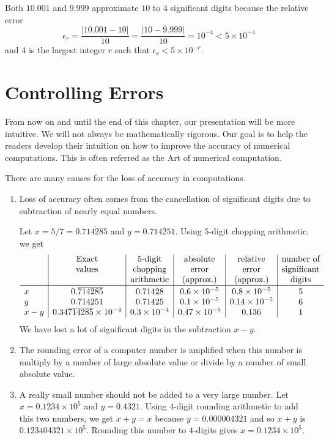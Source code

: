 \begin{egg}
Both $10.001$ and $9.999$ approximate $10$ to $4$ significant
digits because the relative error
\[
\epsilon_r = \frac{|10.001 - 10|}{10} = \frac{|10-9.999|}{10}
= 10^{-4} < 5 \times 10^{-4}
\]
and $4$ is the largest integer $r$ such that $\epsilon_r < 5 \times
10^{-r}$.
\end{egg}

\section{Controlling Errors}

From now on and until the end of this chapter, our presentation will
be more intuitive.  We will not always be mathematically rigorous.
Our goal is to help the readers develop their intuition on how to
improve the accuracy of numerical computations.  This is often
referred as the Art of numerical computation.

There are many causes for the loss of accuracy in computations.

\begin{enumerate}
\item Loss of accuracy often comes from the cancellation of significant
digits due to subtraction of nearly equal numbers.

Let $x= 5/7 = 0.\overline{714285}$ and $y=0.714251$.  Using $5$-digit
chopping arithmetic, we get
\[
\begin{array}{l|c|c|c|c|c}
& \text{Exact} & \text{$5$-digit} & \text{absolute} & \text{relative} &
\text{number of} \\
& \text{values} & \text{chopping} & \text{error} & \text{error} &
\text{significant} \\
& & \text{arithmetic} & \text{(approx.)} & \text{(approx.)} & \text{digits} \\
\hline
x & \rule{0em}{1em} 0.\overline{714285} & 0.71428 & 0.6 \times 10^{-5} &
0.8 \times 10^{-5} & 5 \\
y & 0.714251 & 0.71425 & 0.1 \times 10^{-5} & 0.14\times 10^{-5} & 6 \\
x-y & 0.34\overline{714285}\times 10^{-4} & 0.3 \times 10^{-4} &
0.47\times 10^{-5} & 0.136 & 1
\end{array}
\]
We have lost a lot of significant digits in the subtraction $x-y$.
\item The rounding error of a computer number is amplified when this number
is multiply by a number of large absolute value or divide by a number of
small absolute value.
\item A really small number should not be added to a very large number.
Let $x= 0.1234 \times 10^5$ and $y=0.4321$.  Using $4$-digit rounding
arithmetic to add this two numbers, we get $x+y=x$ because
$y=0.000004321$ and so $x+y$ is $0.123404321 \times 10^5$.  Rounding
this number to $4$-digits gives $x = 0.1234 \times 10^5$.
\end{enumerate}

